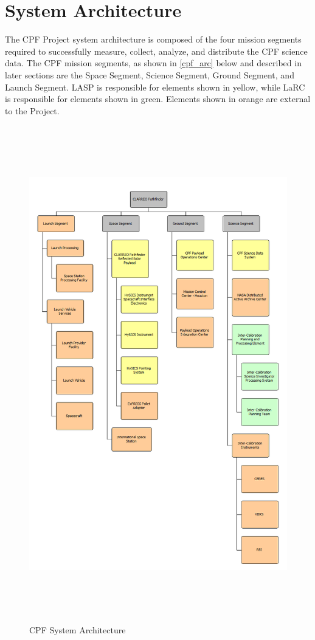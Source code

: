 \documentclass[12pt,oneside,oldfontcommands]{memoir}
\begin{document}
\section{System Architecture }
\label{systemarchitecture}

The \gls{CPF} Project system architecture is composed of the four mission segments required to successfully \gls{measure}, \gls{collect}, analyze, and distribute the \gls{CPF} science data. The \gls{CPF} mission segments, as shown in \autoref{cpf_arc} below and described in later sections are the Space Segment, Science Segment, Ground Segment, and Launch Segment. \gls{LASP} is responsible for elements shown in yellow, while \gls{LaRC} is responsible for elements shown in green. Elements shown in orange are external to the Project.

\begin{figure}[htbp]
\centering
\includegraphics[keepaspectratio,width=\textwidth,height=8.5in]{20171214_cpf_architecture_l1-4.png}
\caption{\gls{CPF} System Architecture}
\label{cpf_arc}
\end{figure}
\end{document}
